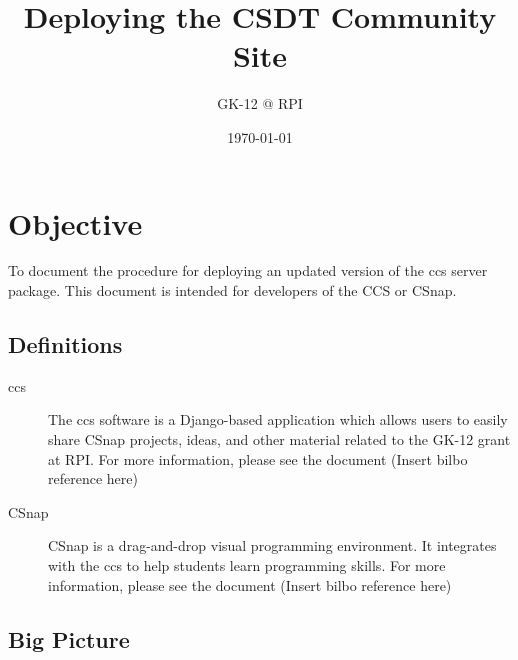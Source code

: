 \documentclass{article}
\title{Deploying the CSDT Community Site} %
\author{GK-12 @ RPI} %
\date{\today} %
\begin{document}
\maketitle %



\section{Objective}

To document the procedure for deploying an updated version of the \ac{ccs} server package. This document is intended for developers of the CCS or CSnap.



\subsection{Definitions}
\label{definitions}
\begin{description}
\item[\acf{ccs}]
The \acl{ccs} software is a Django-based application which allows users to easily share CSnap projects, ideas, and other material related to the GK-12 grant at RPI.
For more information, please see the document (Insert bilbo reference here)
\item[CSnap]
CSnap is a drag-and-drop visual programming environment. 
It integrates with the \ac{ccs} to help students learn programming skills.
For more information, please see the document (Insert bilbo reference here)
\end{description}

\subsection{Big Picture}
\end{document}
